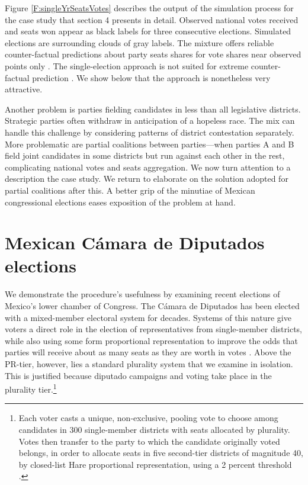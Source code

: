 \documentclass[letter,12pt]{article}
\begin{document}
Figure \ref{F:singleYrSeatsVotes} describes the output of the simulation process for the case study that section 4 presents in detail. Observed national votes received and seats won appear as black labels for three consecutive elections. Simulated elections are surrounding clouds of gray labels. The mixture offers reliable counter-factual predictions about party seats shares for vote shares near observed points only \citep[about $\pm10$ percent,][:fn.\ 8]{linzerSeatVoteElasticity2012}. The single-election approach is not suited for extreme counter-factual prediction \citep{gelman.king.1994EvalElSysRedis}. We show below that the approach is nonetheless very attractive.


Another problem is parties fielding candidates in less than all legislative districts. Strategic parties often withdraw in anticipation of a hopeless race. The mix can handle this challenge by considering patterns of district contestation separately. More problematic are partial coalitions between parties---when parties A and B field joint candidates in some districts but run against each other in the rest, complicating national votes and seats aggregation. We now turn attention to a description the case study. We return to elaborate on the solution adopted for partial coalitions after this. A better grip of the minutiae of Mexican congressional elections eases exposition of the problem at hand. 

\section{Mexican C\'amara de Diputados elections}


We demonstrate the procedure's usefulness by examining recent elections of Mexico's lower chamber of Congress. The C\'amara de Diputados has been elected with a mixed-member electoral system for decades. Systems of this nature give voters a direct role in the election of representatives from single-member districts, while also using some form proportional representation to improve the odds that parties will receive about as many seats as they are worth in votes \citep{shugart.wattenbergIntro2001}. Above the PR-tier, however, lies a standard plurality system that we examine in isolation. This is justified because diputado campaigns and voting take place in the plurality tier.\footnote{Each voter casts a unique, non-exclusive, pooling vote to choose among candidates in 300 single-member districts with seats allocated by plurality. Votes then transfer to the party to which the candidate originally voted belongs, in order to allocate seats in five second-tier districts of magnitude 40, by closed-list Hare proportional representation, using a 2 percent threshold \citep{weldonMixedMemberSys2001}.}
\end{document}
